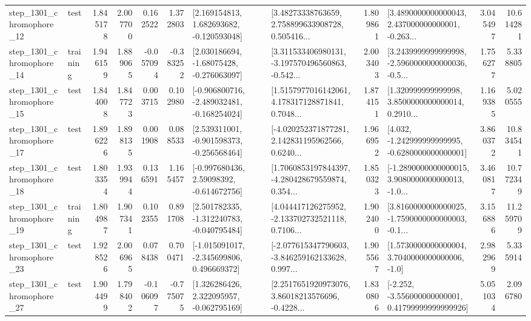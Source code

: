 \begin{tabular}{llrrrrllrlrr}
 step\_1301\_chromophore\_12 &      test &      1.845178 &    2.007700 &      0.162522 &  1.372803 &    [2.169154813, 1.682693682, -0.120593048] &  [3.48273338763659, 2.758899633908728, 0.505416... &       1.809861 &  [3.4890000000000043, 2.437000000000001, -0.263... &            3.045497 &         10.614281 \\
 step\_1301\_chromophore\_14 &  training &      1.946159 &    1.889065 &     -0.057094 & -0.383252 &    [2.030186694, -1.68075428, -0.276063097] &  [3.311533406980131, -3.197570496560863, -0.542... &       2.003403 &  [3.2439999999999998, -2.5960000000000036, -0.5... &            1.756277 &          5.338805 \\
 step\_1301\_chromophore\_15 &      test &      1.844008 &    1.847723 &      0.003715 &  0.102980 &  [-0.906800716, -2.489032481, -0.168254024] &  [1.5157977016142061, 4.178317128871841, 0.7048... &       1.874151 &  [1.320999999999998, 3.8500000000000014, 0.2910... &            1.169385 &          5.020555 \\
 step\_1301\_chromophore\_17 &      test &      1.896226 &    1.898135 &      0.001908 &  0.088533 &   [2.539311001, -0.901598373, -0.256568464] &  [-4.020252371877281, 2.142831195962566, 0.6240... &       1.966952 &   [4.032, -1.242999999999995, -0.6280000000000001] &            3.860372 &         10.834541 \\
 step\_1301\_chromophore\_18 &      test &      1.803354 &    1.939944 &      0.136591 &  1.165457 &    [-0.997680436, 2.59098392, -0.614672756] &  [1.7060853197844397, -4.280428679559874, 0.354... &       1.850323 &  [-1.2890000000000015, 3.9080000000000013, -1.0... &            3.460817 &         10.772349 \\
 step\_1301\_chromophore\_19 &  training &      1.804987 &    1.907341 &      0.102355 &  0.891708 &   [2.501782335, -1.312240783, -0.040795484] &  [4.044417126275952, -2.133702732521118, 0.7106... &       1.902400 &  [3.8160000000000025, -1.7590000000000003, -0.1... &            3.156886 &         11.259709 \\
 step\_1301\_chromophore\_23 &      test &      1.928526 &    2.006965 &      0.078438 &  0.700471 &   [-1.015091017, -2.345699806, 0.496669372] &  [-2.077615347790603, -3.846259162133628, 0.997... &       1.905567 &     [1.5730000000000004, 3.7040000000000006, -1.0] &            2.982969 &          5.335914 \\
 step\_1301\_chromophore\_27 &      test &      1.904499 &    1.798402 &     -0.106097 & -0.775075 &    [1.326286426, 2.322095957, -0.062795169] &  [2.2517651920973076, 3.86018213576696, -0.4228... &       1.830806 &  [-2.252, -3.556000000000001, 0.41799999999999926] &            5.051034 &          2.096780 \\

\end{tabular}

